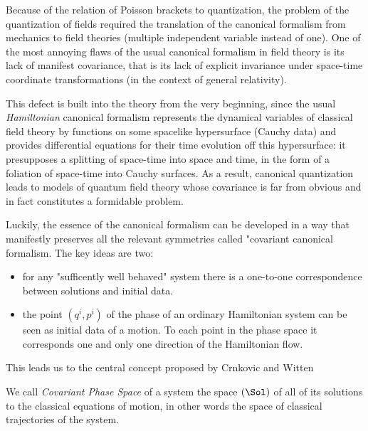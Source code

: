 \documentclass[Main]{subfiles}
\begin{document}
		Because of the relation of Poisson brackets to quantization, the problem of the quantization of fields required the translation of the canonical formalism from mechanics to field theories (multiple independent variable instead of one).
		One of the most annoying flaws of the usual canonical formalism in field theory is its lack of manifest covariance, that is its lack of explicit invariance under space-time coordinate transformations (in the context of general relativity). 
			
			This defect is built into the theory from the very beginning, since the usual \emph{Hamiltonian} canonical formalism represents the dynamical variables of classical field theory by functions on some spacelike hypersurface (Cauchy data) and provides differential equations for their time evolution off this hypersurface: 
			it presupposes a splitting of space-time into space and time, in the form of a foliation of space-time into Cauchy surfaces.	
			As a result, canonical quantization leads to models of quantum field theory whose covariance is far from obvious and in fact constitutes a formidable problem.
		
		Luckily, the essence of the canonical formalism can be developed in a way that manifestly preserves all the relevant symmetries called "covariant canonical formalism.
		The key ideas are two:
		\begin{itemize}
			\item  for any "sufficently well behaved" system there is a one-to-one correspondence between solutions and initial data.
			\item the point $(q^i,p^i)$ of the phase of an ordinary Hamiltonian system can be seen as initial data of a motion.
						To each point in the phase space it corresponds one and only one direction of the Hamiltonian flow.
		\end{itemize}
		This leads us to the central concept proposed by Crnkovic and Witten\cite{Crnkovic1999}
		
		\begin{definition}
			We call \emph{Covariant Phase Space} of a system the space $( \Sol )$ of all of its solutions to the classical equations of motion,
			in other words the space of classical trajectories of the system. 
		\end{definition}
		
\end{document}
